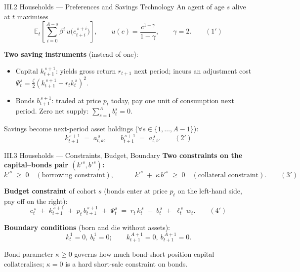 \documentclass[aspectratio=169,11pt]{beamer}
\newcommand{\emphc}[1]{\textcolor{harvardcrimson}{#1}}
\begin{document}
\begin{frame}{III.2 Households --- Preferences and Savings Technology}
\small
An agent of age $s$ alive at $t$ maximises
\[
\mathbb{E}_t\!\left[\sum_{i=0}^{A-s} \beta^i \,u\!\bigl(c_{t+i}^{\,s+i}\bigr)\right], \qquad u(c) = \frac{c^{1-\gamma}}{1-\gamma}, \qquad \gamma = 2. \qquad (1')
\]

\vspace{0.3em}
\textbf{Two saving instruments} (instead of one):
\begin{itemize}\itemsep2pt
    \item \emphc{Capital} $k_{t+1}^{\,s+1}$: yields gross return $r_{t+1}$ next period; incurs an \emphc{adjustment cost} $\Psi_t^s = \tfrac{\zeta}{2}(k_{t+1}^{\,s+1} - r_t k_t^{\,s})^2$.
    \item \emphc{Bonds} $b_{t+1}^{\,s+1}$: traded at price $p_t$ today, pay one unit of consumption next period. \emphc{Zero net supply}: $\sum_{s=1}^A b_t^s = 0$.
\end{itemize}

\vspace{0.3em}
Savings become next-period asset holdings ($\forall s \in \{1, \ldots, A-1\}$):
\[
k_{t+1}^{\,s+1} \;=\; a_{t,k}^{\,s}, \qquad b_{t+1}^{\,s+1} \;=\; a_{t,b}^{\,s}. \qquad (2')
\]
\end{frame}


\begin{frame}{III.3 Households --- Constraints, Budget, Boundary}
\small
\textbf{Two constraints on the capital--bonds pair $(k'^s, b'^s)$:}
\[
k'^s \;\ge\; 0 \quad (\text{borrowing constraint}), \qquad\quad
k'^s \;+\; \kappa\, b'^s \;\ge\; 0 \quad (\text{collateral constraint}).
\qquad (3')
\]

\vspace{0.4em}
\textbf{Budget constraint} of cohort $s$ (bonds enter at price $p_t$ on the left-hand side, pay off on the right):
\[
c_t^{\,s} \;+\; k_{t+1}^{\,s+1} \;+\; p_t\, b_{t+1}^{\,s+1} \;+\; \Psi_t^s
\;=\; r_t\, k_t^{\,s} \;+\; b_t^{\,s} \;+\; \ell_t^{\,s}\, w_t.
\qquad (4')
\]

\vspace{0.4em}
\textbf{Boundary conditions} (born and die without assets):
\[
k_t^{\,1} = 0,\ b_t^{\,1} = 0; \qquad k_{t+1}^{\,A+1} = 0,\ b_{t+1}^{\,A+1} = 0.
\]

\vspace{0.3em}
{\footnotesize Bond parameter $\kappa \ge 0$ governs how much bond-short position capital collateralises; $\kappa = 0$ is a \emphc{hard} short-sale constraint on bonds.}
\end{frame}
\end{document}
